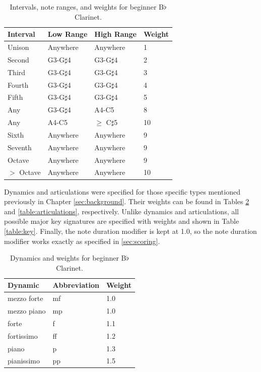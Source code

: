 \documentclass[12pt]{report}
\begin{document}
\begin{table}[t]
	\centering
	\caption{Intervals, note ranges, and weights for beginner B$\flat$ Clarinet.}
    \begin{tabular}{| l | l | l | l |}
        \hline
        Interval & Low Range & High Range & Weight \\ \hline
        Unison & Anywhere & Anywhere & 1 \\ \hline
        Second & G3-G$\sharp$4 & G3-G$\sharp$4 & 2 \\ \hline
        Third & G3-G$\sharp$4 & G3-G$\sharp$4 & 3 \\ \hline
        Fourth & G3-G$\sharp$4 & G3-G$\sharp$4 & 4 \\ \hline
        Fifth & G3-G$\sharp$4 & G3-G$\sharp$4 & 5 \\ \hline
        Any & G3-G$\sharp$4 & A4-C5 & 8 \\ \hline
        Any & A4-C5 & $\geq$ C$\sharp$5 & 10 \\ \hline
        Sixth & Anywhere & Anywhere & 9 \\ \hline
        Seventh & Anywhere & Anywhere & 9 \\ \hline
        Octave & Anywhere & Anywhere & 9 \\ \hline
        $>$ Octave & Anywhere & Anywhere & 10 \\
        \hline
    \end{tabular}
	\label{table:intervals}
\end{table}

Dynamics and articulations were specified for those specific types mentioned previously in Chapter \ref{sec:background}. Their weights can be found in Tables \ref{table:dynamics} and \ref{table:articulations}, respectively. Unlike dynamics and articulations, all possible major key signatures are specified with weights and shown in Table \ref{table:key}. Finally, the note duration modifier is kept at 1.0, so the note duration modifier works exactly as specified in \ref{sec:scoring}.

\begin{table}
	\centering
	\caption{Dynamics and weights for beginner B$\flat$ Clarinet.}
	\label{table:dynamics}
    \begin{tabular}{| l | l | l |}
        \hline
        Dynamic & Abbreviation & Weight \\ \hline
        mezzo forte & mf & 1.0 \\ \hline
        mezzo piano & mp & 1.0 \\ \hline
        forte & f & 1.1 \\ \hline
        fortissimo & ff & 1.2 \\ \hline
        piano & p & 1.3 \\ \hline
        pianissimo & pp & 1.5 \\
        \hline
    \end{tabular}
\end{table}
\end{document}
